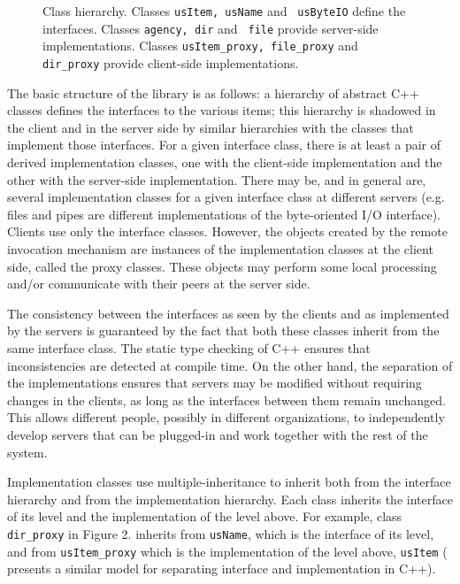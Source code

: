 \begin{figure}[htbp]
\vspace{6cm}
{}
\caption{Class hierarchy. Classes {\tt usItem, usName} and {\tt
usByteIO} define the interfaces. Classes {\tt agency, dir} and {\tt
file} provide server-side implementations. Classes {\tt usItem\_proxy,
file\_proxy} and {\tt dir\_proxy} provide client-side
implementations.} 
\end{figure}

The basic structure of the library is as follows: a hierarchy of
abstract C++ classes defines the interfaces to the various items; this
hierarchy is shadowed in the client and in the server side by similar
hierarchies with the classes that implement those interfaces. For a
given interface class, there is at least a pair of derived
implementation classes, one with the client-side implementation and
the other with the server-side implementation. There may be, and in
general are, several implementation classes for a given interface
class at different servers (e.g. files and pipes are different
implementations of the byte-oriented I/O interface). Clients use only
the interface classes. However, the objects created by the remote
invocation mechanism are instances of the implementation classes at
the client side, called the proxy classes. These objects may perform
some local processing and/or communicate with their peers at the
server side.

The consistency between the interfaces as seen by the clients and as
implemented by the servers is guaranteed by the fact that both these
classes inherit from the same interface class. The static type
checking of C++ ensures that inconsistencies are detected at compile
time. On the other hand, the separation of the implementations ensures
that servers may be modified without requiring changes in the clients,
as long as the interfaces between them remain unchanged. This allows
different people, possibly in different organizations, to
independently develop servers that can be plugged-in and work
together with the rest of the system.

Implementation classes use multiple-inheritance to inherit both from
the interface hierarchy and from the implementation hierarchy. Each
class inherits the interface of its level and the implementation of
the level above. For example, class {\tt dir\_proxy} in Figure 2.
inherits from {\tt usName}, which is the interface of its level, and
from {\tt usItem\_proxy} which is the implementation of the level
above, {\tt usItem} (\cite{martin} presents a similar model for
separating interface and implementation in C++).

